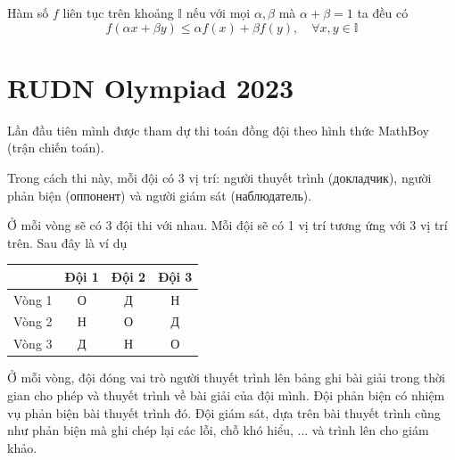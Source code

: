\documentclass{mynotes}
\theoremstyle{definition}
\newcommand{\II}{\mathbb{I}}
\begin{document}
\begin{definition}
    Hàm số $f$ liên tục trên khoảng $\II$ nếu với mọi $\alpha, \beta$ mà $\alpha + \beta = 1$ ta đều có 
    \begin{equation}
        f(\alpha x + \beta y) \leqslant \alpha f(x) + \beta f(y), \quad \forall x, y \in \II
    \end{equation}
\end{definition}











\appendix





\chapter{RUDN Olympiad 2023}

Lần đầu tiên mình được tham dự thi toán đồng đội theo hình thức MathBoy (trận chiến toán).

Trong cách thi này, mỗi đội có 3 vị trí: người thuyết trình (докладчик), người phản biện (оппонент) và người giám sát (наблюдатель).

Ở mỗi vòng sẽ có 3 đội thi với nhau. Mỗi đội sẽ có 1 vị trí tương ứng với 3 vị trí trên. Sau đây là ví dụ

\begin{table}[ht]
    \centering
    \begin{tabular}{|c|c|c|c|}
        \hline
        & Đội 1 & Đội 2 & Đội 3 \\ \hline
        Vòng 1 & О & Д & Н \\ \hline
        Vòng 2 & Н & О & Д \\ \hline
        Vòng 3 & Д & Н & О \\ \hline
    \end{tabular}
\end{table}

Ở mỗi vòng, đội đóng vai trò người thuyết trình lên bảng ghi bài giải trong thời gian cho phép và thuyết trình về bài giải của đội mình. Đội phản biện có nhiệm vụ phản biện bài thuyết trình đó. Đội giám sát, dựa trên bài thuyết trình cũng như phản biện mà ghi chép lại các lỗi, chỗ khó hiểu, ... và trình lên cho giám khảo.
\end{document}
